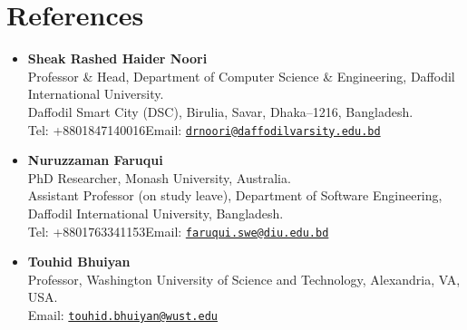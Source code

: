 \documentclass[11pt,a4paper]{article}
\begin{document}
\section*{References}
\begin{itemize}[itemsep=6pt]
 \item \textbf{Sheak Rashed Haider Noori}\\[-1pt]
 {\small Professor \& Head, Department of Computer Science \& Engineering, Daffodil International University.\\
 Daffodil Smart City (DSC), Birulia, Savar, Dhaka--1216, Bangladesh.\\
 Tel: +8801847140016\quad Email: \href{mailto:drnoori@daffodilvarsity.edu.bd}{\texttt{drnoori@daffodilvarsity.edu.bd}}}
 \item \textbf{Nuruzzaman Faruqui}\\[-1pt]
 {\small PhD Researcher, Monash University, Australia.\\
 Assistant Professor (on study leave), Department of Software Engineering,\\
 Daffodil International University, Bangladesh.\\
 Tel: +8801763341153\quad Email: \href{mailto:faruqui.swe@diu.edu.bd}{\texttt{faruqui.swe@diu.edu.bd}}}
 \item \textbf{Touhid Bhuiyan}\\[-1pt]
 {\small Professor, Washington University of Science and Technology, Alexandria, VA, USA.\\
 Email: \href{mailto:touhid.bhuiyan@wust.edu}{\texttt{touhid.bhuiyan@wust.edu}}}
\end{itemize}
\end{document}

